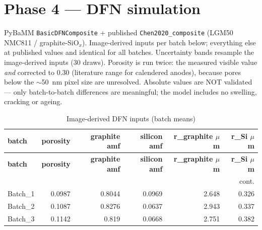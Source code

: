 \documentclass[11pt,a4paper]{article}
\begin{document}
\section{Phase 4 --- DFN simulation}
PyBaMM \texttt{BasicDFNComposite} + published \texttt{Chen2020\_composite}
(LGM50 NMC811 / graphite-SiO$_x$). Image-derived inputs per batch below;
everything else at published values and identical for all batches.
Uncertainty bands resample the image-derived inputs (30 draws). Porosity is
run twice: the measured visible value \emph{and} corrected to 0.30
(literature range for calendered anodes), because pores below the
$\sim$50~nm pixel size are unresolved. Absolute values are NOT validated ---
only batch-to-batch differences are meaningful; the model includes no
swelling, cracking or ageing.
\scriptsize
\begin{longtable}{lrrrrr}
\caption{Image-derived DFN inputs (batch means)}\label{tab:dfninputs}\\
\toprule
\textbf{batch} & \textbf{porosity} & \textbf{graphite amf} & \textbf{silicon amf} & \textbf{r\_graphite $\mu$m} & \textbf{r\_Si $\mu$m} \\
\midrule
\endfirsthead
\toprule \textbf{batch} & \textbf{porosity} & \textbf{graphite amf} & \textbf{silicon amf} & \textbf{r\_graphite $\mu$m} & \textbf{r\_Si $\mu$m} \\
\midrule
\endhead
\midrule\multicolumn{6}{r}{\footnotesize cont.}\\\midrule\endfoot
\bottomrule\endlastfoot
Batch\_1 & 0.0987 & 0.8044 & 0.0969 & 2.648 & 0.326 \\
Batch\_2 & 0.1087 & 0.8276 & 0.0637 & 2.943 & 0.337 \\
Batch\_3 & 0.1142 & 0.819 & 0.0668 & 2.751 & 0.382 \\
\end{longtable}
\normalsize
\scriptsize
\end{document}
